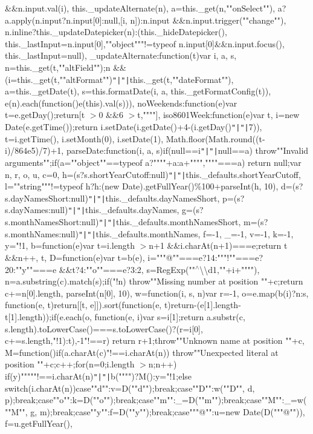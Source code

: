 \&\&n.\+input.\+val(i), this.\+\_\+update\+Alternate(n), a=this.\+\_\+get(n,""on\+Select""), a?a.\+apply(n.\+input?n.\+input[0]\+:null,[i, n])\+:n.\+input \&\&n.\+input.\+trigger(""change""), n.\+inline?this.\+\_\+update\+Datepicker(n)\+:(this.\+\_\+hide\+Datepicker(), this.\+\_\+last\+Input=n.\+input[0],""object"""!=typeof n.\+input[0]\&\&n.\+input.\+focus(), this.\+\_\+last\+Input=null)\rcurly{}, \+\_\+update\+Alternate\+:function(t)\lcurly{}var i, a, s, n=this.\+\_\+get(t,""alt\+Field"");n \&\&(i=this.\+\_\+get(t,""alt\+Format"")\texttt{"|}\texttt{"|}this.\+\_\+get(t,""date\+Format""), a=this.\+\_\+get\+Date(t), s=this.\+format\+Date(i, a, this.\+\_\+get\+Format\+Config(t)), e(n).\+each(function()\lcurly{}e(this).\+val(s)\rcurly{}))\rcurly{}, no\+Weekends\+:function(e)\lcurly{}var t=e.\+get\+Day();return[t $>$0 \&\&6 $>$t,""""]\rcurly{}, iso8601\+Week\+:function(e)\lcurly{}var t, i=new Date(e.\+get\+Time());return i.\+set\+Date(i.\+get\+Date()+4-\/(i.\+get\+Day()\texttt{"|}\texttt{"|}7)), t=i.\+get\+Time(), i.\+set\+Month(0), i.\+set\+Date(1), Math.\+floor(\+Math.\+round((t-\/i)/864e5)/7)+1\rcurly{}, parse\+Date\+:function(i, a, s)\lcurly{}if(null==i\texttt{"|}\texttt{"|}null==a) throw""Invalid arguments"";if(a=""object""==typeof a?""""+a\+:a+"""",""""===a) return null;var n, r, o, u, c=0, h=(s?s.\+short\+Year\+Cutoff\+:null)\texttt{"|}\texttt{"|}this.\+\_\+defaults.\+short\+Year\+Cutoff, l=""string"""!=typeof h?h\+:(new Date).\+get\+Full\+Year()\%100+parse\+Int(h, 10), d=(s?s.\+day\+Names\+Short\+:null)\texttt{"|}\texttt{"|}this.\+\_\+defaults.\+day\+Names\+Short, p=(s?s.\+day\+Names\+:null)\texttt{"|}\texttt{"|}this.\+\_\+defaults.\+day\+Names, g=(s?s.\+month\+Names\+Short\+:null)\texttt{"|}\texttt{"|}this.\+\_\+defaults.\+month\+Names\+Short, m=(s?s.\+month\+Names\+:null)\texttt{"|}\texttt{"|}this.\+\_\+defaults.\+month\+Names, f=-\/1, \+\_\+=-\/1, v=-\/1, k=-\/1, y="!1, b=function(e)\lcurly{}var t=i.\+length $>$n+1 \&\&i.\+char\+At(n+1)===e;return t \&\&n++, t\rcurly{}, D=function(e)\lcurly{}var t=b(e), i="""@""===e?14\+:"""!""===e?20\+:""y""===e \&\&t?4\+:""o""===e?3\+:2, s=\+Reg\+Exp(""$^\wedge$\textbackslash{}\textbackslash{}d\lcurly{}1,""+i+""\rcurly{}""), n=a.\+substring(c).\+match(s);if("!n) throw""Missing number at position ""+c;return c+=n[0].\+length, parse\+Int(n[0], 10)\rcurly{}, w=function(i, s, n)\lcurly{}var r=-\/1, o=e.\+map(b(i)?n\+:s, function(e, t)\lcurly{}return[[t, e]]\rcurly{}).\+sort(function(e, t)\lcurly{}return-\/(e[1].\+length-\/t[1].\+length)\rcurly{});if(e.\+each(o, function(e, i)\lcurly{}var s=i[1];return a.\+substr(c, s.\+length).\+to\+Lower\+Case()===s.\+to\+Lower\+Case()?(r=i[0], c+=s.\+length,"!1)\+:t\rcurly{}),-\/1"!==r) return r+1;throw""Unknown name at position ""+c\rcurly{}, M=function()\lcurly{}if(a.\+char\+At(c)"!==i.\+char\+At(n)) throw""Unexpected literal at position ""+c;c++\rcurly{};for(n=0;i.\+length $>$n;n++) if(y)""\textquotesingle{}"""!==i.\+char\+At(n)\texttt{"|}\texttt{"|}b(""\textquotesingle{}"")?\+M()\+:y="!1;else switch(i.\+char\+At(n))\lcurly{}case""d""\+:v=\+D(""d"");break;case""D""\+:w(""D"", d, p);break;case""o""\+:k=\+D(""o"");break;case""m""\+:\+\_\+=\+D(""m"");break;case""M""\+:\+\_\+=w(""M"", g, m);break;case""y""\+:f=\+D(""y"");break;case"""@""\+:u=new Date(\+D("""@"")), f=u.\+get\+Full\+Year(), 